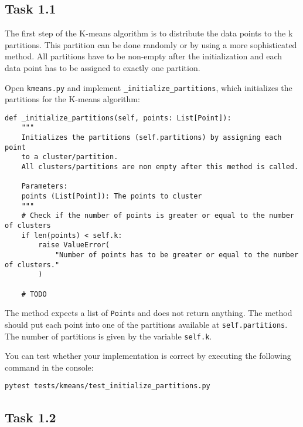 \documentclass[
english,
smallborders
]{i6prcsht}
\begin{document}
\subsection*{Task 1.1}

The first step of the K-means algorithm is to distribute the data points to the k partitions. This partition can be done randomly or by using a more sophisticated method. All partitions have to be non-empty after the initialization and each data point has to be assigned to exactly one partition.

Open \texttt{kmeans.py} and implement \texttt{\_initialize\_partitions}, which initializes the partitions for the K-means algorithm:

\vspace*{0.3cm}

\begin{lstlisting}
def _initialize_partitions(self, points: List[Point]):
	"""
	Initializes the partitions (self.partitions) by assigning each point 
	to a cluster/partition.
	All clusters/partitions are non empty after this method is called.

	Parameters:
	points (List[Point]): The points to cluster
	"""
	# Check if the number of points is greater or equal to the number of clusters
	if len(points) < self.k:
		raise ValueError(
			"Number of points has to be greater or equal to the number of clusters."
		)

	# TODO
\end{lstlisting}

\vspace*{0.1cm}

The method expects a list of \texttt{Point}s and does not return anything. The method should put each point into one of the partitions available at \texttt{self.partitions}. The number of partitions is given by the variable \texttt{self.k}.

You can test whether your implementation is correct by executing the following command in
the console:

\vspace*{0.3cm}

\begin{lstlisting}
pytest tests/kmeans/test_initialize_partitions.py
\end{lstlisting}

\vspace*{0.1cm}

\subsection*{Task 1.2}
\end{document}
